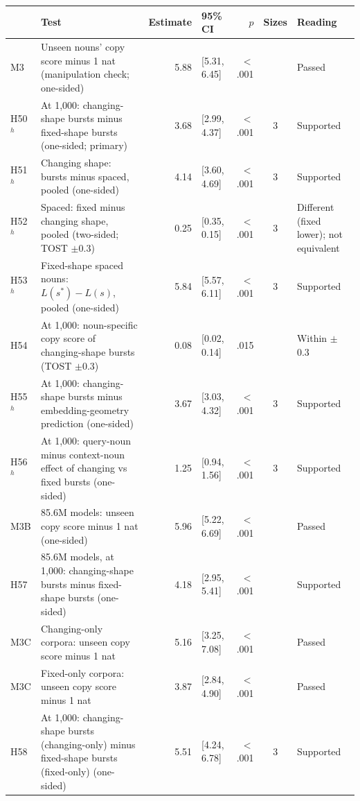 \begin{table}[!htbp]
\centering\small

\begin{tabular}{@{}l>{\raggedright\arraybackslash}p{}rlrc>{\raggedright\arraybackslash}p{}@{}}
\toprule
& Test & Estimate & 95\% CI & $p$ & Sizes & Reading \\
\midrule
M3 & Unseen nouns' copy score minus 1 nat (manipulation check; one-sided) & 5.88 & [5.31, 6.45] & $<$.001 &  & Passed \\
H50$^h$ & At 1,000: changing-shape bursts minus fixed-shape bursts (one-sided; primary) & 3.68 & [2.99, 4.37] & $<$.001 & 3 & Supported \\
H51$^h$ & Changing shape: bursts minus spaced, pooled (one-sided) & 4.14 & [3.60, 4.69] & $<$.001 & 3 & Supported \\
H52$^h$ & Spaced: fixed minus changing shape, pooled (two-sided; TOST $\pm$0.3) & \textminus{}0.25 & [\textminus{}0.35, \textminus{}0.15] & $<$.001 & 3 & Different (fixed lower); not equivalent \\
H53$^h$ & Fixed-shape spaced nouns: $L(s^*) - L(s)$, pooled (one-sided) & 5.84 & [5.57, 6.11] & $<$.001 & 3 & Supported \\
H54 & At 1,000: noun-specific copy score of changing-shape bursts (TOST $\pm$0.3) & 0.08 & [0.02, 0.14] & .015 &  & Within $\pm$0.3 \\
H55$^h$ & At 1,000: changing-shape bursts minus embedding-geometry prediction (one-sided) & 3.67 & [3.03, 4.32] & $<$.001 & 3 & Supported \\
H56$^h$ & At 1,000: query-noun minus context-noun effect of changing vs fixed bursts (one-sided) & 1.25 & [0.94, 1.56] & $<$.001 & 3 & Supported \\
M3B & 85.6M models: unseen copy score minus 1 nat (one-sided) & 5.96 & [5.22, 6.69] & $<$.001 &  & Passed \\
H57 & 85.6M models, at 1,000: changing-shape bursts minus fixed-shape bursts (one-sided) & 4.18 & [2.95, 5.41] & $<$.001 &  & Supported \\
M3C & Changing-only corpora: unseen copy score minus 1 nat & 5.16 & [3.25, 7.08] & $<$.001 &  & Passed \\
M3C & Fixed-only corpora: unseen copy score minus 1 nat & 3.87 & [2.84, 4.90] & $<$.001 &  & Passed \\
H58 & At 1,000: changing-shape bursts (changing-only) minus fixed-shape bursts (fixed-only) (one-sided) & 5.51 & [4.24, 6.78] & $<$.001 & 3 & Supported \\

\end{tabular}
\end{table}
